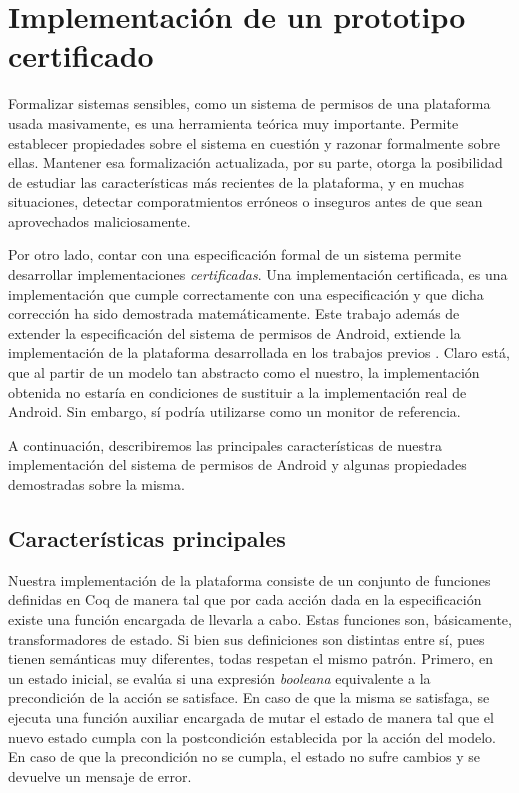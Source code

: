 \chapter{Implementación de un prototipo certificado}
\label{chapter:implementation}
Formalizar sistemas sensibles, como un sistema de permisos de una plataforma usada masivamente, es
una herramienta teórica muy importante. Permite establecer propiedades sobre el sistema en cuestión
y razonar formalmente sobre ellas. Mantener esa formalización actualizada, por su parte, otorga la
posibilidad de estudiar las características más recientes de la plataforma, y en muchas situaciones,
detectar comporatmientos erróneos o inseguros antes de que sean aprovechados maliciosamente.

Por otro lado, contar con una especificación formal de un sistema permite desarrollar
implementaciones \textit{certificadas}. Una implementación certificada, es una implementación que
cumple correctamente con una especificación y que dicha corrección ha sido demostrada
matemáticamente. Este trabajo además de extender la especificación del sistema de permisos de
Android, extiende la implementación de la plataforma desarrollada en los trabajos previos
\cite{betarte-2017,luna-cleiej}. Claro está, que al partir de un modelo tan abstracto como el
nuestro, la implementación obtenida no estaría en condiciones de sustituir a la implementación real
de Android. Sin embargo, sí podría utilizarse como un monitor de referencia.

A continuación, describiremos las principales características de nuestra implementación del sistema
de permisos de Android y algunas propiedades demostradas sobre la misma.

\section{Características principales}
Nuestra implementación de la plataforma consiste de un conjunto de funciones definidas en Coq de
manera tal que por cada acción dada en la especificación existe una función encargada de llevarla a
cabo. Estas funciones son, básicamente, transformadores de estado. Si bien sus definiciones son
distintas entre sí, pues tienen semánticas muy diferentes, todas respetan el mismo patrón. Primero,
en un estado inicial, se evalúa si una expresión \textit{booleana} equivalente a la precondición de
la acción se satisface. En caso de que la misma se satisfaga, se ejecuta una función auxiliar
encargada de mutar el estado de manera tal que el nuevo estado cumpla con la postcondición
establecida por la acción del modelo. En caso de que la precondición no se cumpla, el estado no
sufre cambios y se devuelve un mensaje de error.

